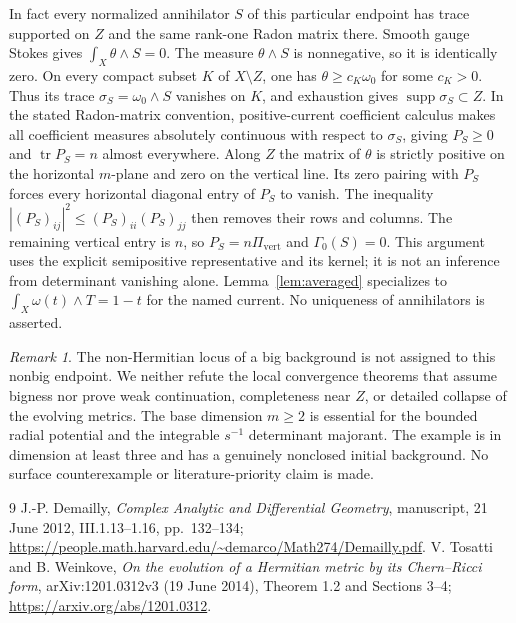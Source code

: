 \documentclass[11pt]{article}
\theoremstyle{remark}\newtheorem{remark}[theorem]{Remark}
\begin{document}
In fact every normalized annihilator $S$ of this particular endpoint has
trace supported on $Z$ and the same rank-one Radon matrix there. Smooth
gauge Stokes gives $\int_X\theta\wedge S=0$. The measure
$\theta\wedge S$ is nonnegative, so it is identically zero. On every
compact subset $K$ of $X\setminus Z$, one has
$\theta\geq c_K\omega_0$ for some $c_K>0$. Thus its trace
$\sigma_S=\omega_0\wedge S$ vanishes on $K$, and exhaustion gives
$\operatorname{supp}\sigma_S\subset Z$.
In the stated Radon-matrix convention, positive-current coefficient
calculus \cite[III.1.13--1.16, pp.~132--134]{Demailly} makes all coefficient
measures absolutely continuous with respect to $\sigma_S$, giving
$P_S\geq0$ and $\operatorname{tr}P_S=n$ almost everywhere.
Along $Z$ the matrix of $\theta$ is strictly positive on the horizontal
$m$-plane and zero on the vertical line. Its zero pairing with $P_S$
forces every horizontal diagonal entry of $P_S$ to vanish. The inequality
$|(P_S)_{ij}|^2\leq(P_S)_{ii}(P_S)_{jj}$ then removes their rows and
columns. The remaining vertical entry is $n$, so
$P_S=n\Pi_{\mathrm{vert}}$ and $\Gamma_0(S)=0$.
This argument uses the explicit semipositive representative and its kernel;
it is not an inference from determinant vanishing alone.
Lemma~\ref{lem:averaged} specializes to $\int_X\omega(t)\wedge T=1-t$
for the named current. No uniqueness of annihilators is asserted.

\begin{remark}
The non-Hermitian locus of a big background is not assigned to this
nonbig endpoint. We neither refute the local convergence theorems that
assume bigness nor prove weak continuation, completeness near $Z$, or
detailed collapse of the evolving metrics. The base dimension $m\geq2$
is essential for the bounded radial potential and the integrable
$s^{-1}$ determinant majorant. The example is in dimension at least
three and has a genuinely nonclosed initial background. No surface
counterexample or literature-priority claim is made.
\end{remark}

\begin{thebibliography}{9}
 J.-P. Demailly, \emph{Complex Analytic and Differential
Geometry}, manuscript, 21 June 2012, III.1.13--1.16, pp.~132--134;
\url{https://people.math.harvard.edu/~demarco/Math274/Demailly.pdf}.
 V. Tosatti and B. Weinkove, \emph{On the evolution of a Hermitian
metric by its Chern--Ricci form}, arXiv:1201.0312v3 (19 June 2014),
Theorem 1.2 and Sections 3--4; \url{https://arxiv.org/abs/1201.0312}.
\end{thebibliography}
\end{document}
